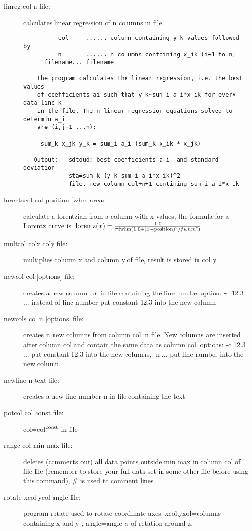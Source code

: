 \begin{description}
\item [\prg linreg col n file:] calculates linear regression of n columns in file
\begin{verbatim}
          col     ...... column containing y_k values followed by
          n       ...... n columns containing x_ik (i=1 to n)
	  filename... filename

    the program calculates the linear regression, i.e. the best values
    of coefficients ai such that y_k~sum_i a_i*x_ik for every data line k
    in the file. The n linear regression equations solved to determin a_i
    are (i,j=1 ...n):

     sum_k x_jk y_k = sum_i a_i (sum_k x_ik * x_jk)

   Output: - sdtoud: best coefficients a_i  and standard deviation
             sta=sum_k (y_k-sum_i a_i*x_ik)^2
           - file: new column col+n+1 contining sum_i a_i*x_ik
\end{verbatim}

\item [\prg lorentzcol col position fwhm area:] calculate a lorentzian from
a column with x values, the formula for a Lorentz curve is: 
${\rm lorentz}(x)=\frac{1.0}{\pi{\rm fwhm}(1.0+(x-{\rm position})^2/fwhm^2)}$
\item [\prg multcol  colx coly file:] multiplies column x and column y of file, %
result is stored in col y
\item [\prg newcol col {[options]} file:] creates a new column col in file containing the line numbe. option: -c 12.3  ... instead of line number put constant 12.3 into the new column
\item [\prg newcols col n {[options]} file:] creates n new columns from column col
 in file. New columns are inserted after column col and contain the same data as column col.
 options: -c 12.3 ...  put constant 12.3 into the new columns, -n ... put line number into the new column.
\item [\prg newline n text file:] creates a new line number n  in file containing %
the text 
\item [\prg potcol col const file:]  col=col$^{\rm const}$ in file
\item [\prg range col min max file:] deletes (comments out) all data points outside %
min max in column  col of
                       file file (remember to store your full data set in some other
		       file before using this command), \# is used to comment lines
\item[\prg rotate xcol ycol angle file:]
program rotate  used to rotate coordinate axes,
 xcol,yxol=columns containing x and y , 
 angle=angle $\alpha$ of rotation around z.
 

\end{description}
